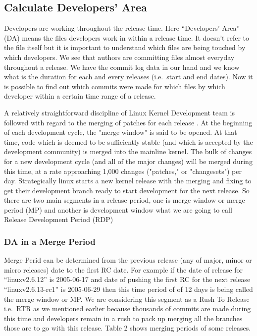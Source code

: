 \documentclass{acm_proc_article-sp}
\begin{document}
\subsection{Calculate Developers' Area}
Developers are working throughout the release time. Here ``Developers' Area'' (DA) means the files developers work in within a release time. It doesn't refer to the file itself but it is important to understand which files are being touched by which developers. We see that authors are committing files almost everyday throughout a release. We have the commit log data in our hand and we know what is the duration for each and every releases (i.e.\ start and end dates). Now it is possible to find out which commits were made for which files by which developer within a certain time range of a release.

A relatively straightforward discipline of Linux Kernel Development team is followed with regard to the merging of patches for each release \cite{linux_kernel}.  At the beginning of each development cycle, the "merge window" is said to be opened.  At that time, code which is deemed to be sufficiently stable (and which is accepted by the development community) is merged into the mainline kernel. The bulk of changes for a new development cycle (and all of the major changes) will be merged during this time, at a rate approaching 1,000 changes ("patches," or "changesets") per day. Strategically linux starts a new kernel release with the merging and fixing to get their development branch ready to start development for the next release. So there are two main segments in a release period, one is merge window or merge period (MP) and another is development window what we are going to call Release Development Period (RDP)

\subsubsection{DA in a Merge Period}
Merge Perid can be determined from the previous release (any of major, minor or micro releases) date to the first RC date. For example if the date of release for ``linuxv2.6.12''  is 2005-06-17 and date of pushing the first RC for the next release ``linuxv2.6.13-rc1'' is 2005-06-29 then this time period of of 12 days is being called the merge window \cite{14_kernel} or MP. We are considering this segment as a Rush To Release i.e.\ RTR as we mentioned earlier because thousands of commits are made during this time and developers remain in a rush to pack up merging all the branches those are to go with this release. Table 2 shows merging periods of some releases.
\end{document}
